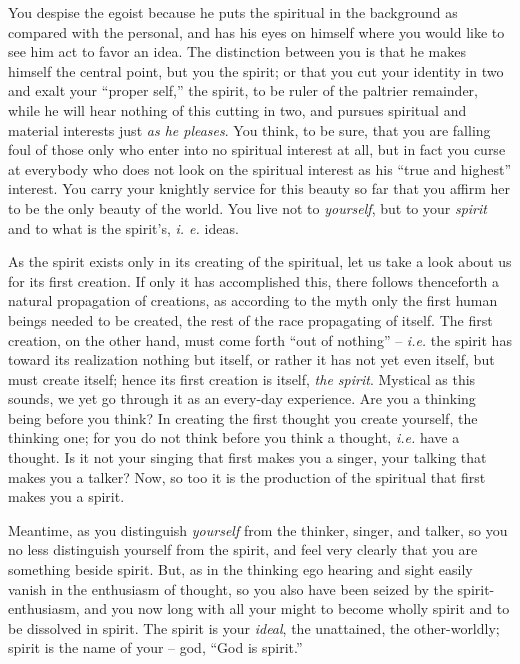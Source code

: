 \documentclass[12pt,a4paper]{book}
\begin{document}
You despise the egoist because he puts the spiritual in the background as 
compared with the personal, and has his eyes on himself where you would like 
to see him act to favor an idea. The distinction between you is that he makes 
himself the central point, but you the spirit; or that you cut your identity 
in two and exalt your ``proper self,'' the spirit, to be ruler of the 
paltrier remainder, while he will hear nothing of this cutting in two, and 
pursues spiritual and material interests just \textit{as he pleases}. You 
think, to be sure, that you are falling foul of those only who enter into no 
spiritual interest at all, but in fact you curse at everybody who does not 
look on the spiritual interest as his ``true and highest'' interest. You 
carry your knightly service for this beauty so far that you affirm her to be 
the only beauty of the world. You live not to \textit{yourself}, but to your 
\textit{spirit} and to what is the spirit's, \textit{i. e.} ideas.

As the spirit exists only in its creating of the spiritual, let us take a look 
about us for its first creation. If only it has accomplished this, there 
follows thenceforth a natural propagation of creations, as according to the 
myth only the first human beings needed to be created, the rest of the race 
propagating of itself. The first creation, on the other hand, must come forth 
``out of nothing'' -- \textit{i.e.} the spirit has toward its realization 
nothing but itself, or rather it has not yet even itself, but must create 
itself; hence its first creation is itself, \textit{the spirit}. Mystical as 
this sounds, we yet go through it as an every-day experience. Are you a 
thinking being before you think? In creating the first thought you create 
yourself, the thinking one; for you do not think before you think a thought, 
\textit{i.e.} have a thought. Is it not your singing that first makes you a 
singer, your talking that makes you a talker? Now, so too it is the production 
of the spiritual that first makes you a spirit.

Meantime, as you distinguish \textit{yourself} from the thinker, singer, and 
talker, so you no less distinguish yourself from the spirit, and feel very 
clearly that you are something beside spirit. But, as in the thinking ego 
hearing and sight easily vanish in the enthusiasm of thought, so you also have 
been seized by the spirit-enthusiasm, and you now long with all your might to 
become wholly spirit and to be dissolved in spirit. The spirit is your 
\textit{ideal}, the unattained, the other-worldly; spirit is the name of your 
-- god, ``God is spirit.''
\end{document}

